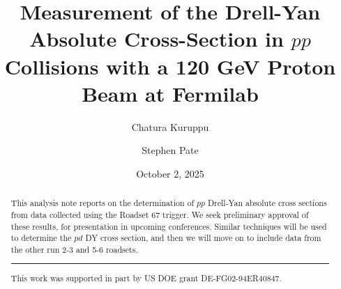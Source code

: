 \documentclass[11pt]{article}
\newcommand{\diffd}{\mathrm{d}}
\begin{document}
\linenumbers
\title{\textbf{Measurement of the Drell-Yan Absolute Cross-Section in $pp$ Collisions with a 120 GeV Proton Beam at Fermilab}}
\author[1]{Chatura Kuruppu}
\author[1]{Stephen Pate}
\date{October 2, 2025}
\maketitle

\begin{abstract}
This analysis note reports on the determination of $pp$ Drell-Yan absolute cross sections from data collected using the Roadset 67 trigger.
We seek preliminary approval of these results, for presentation in upcoming conferences.  Similar techniques will be used to determine the $pd$ DY cross section, and then we will move on to include data from the other run 2-3 and 5-6 roadsets.
\vspace{1em}
\hrule
\vspace{1em}
\footnotesize{This work was supported in part by US DOE grant DE-FG02-94ER40847.}
\end{abstract}

\clearpage

\tableofcontents
\clearpage
\listoffigures
\clearpage
\listoftables
\clearpage

\end{document}
